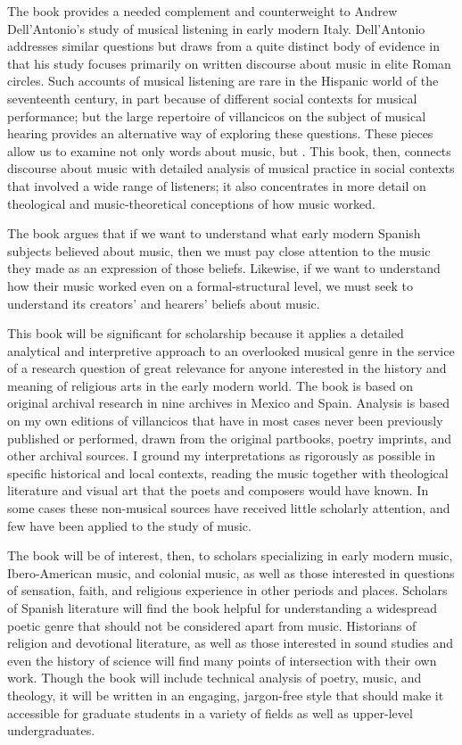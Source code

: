 \documentclass{vcbook-proposal}
\begin{document}
The book provides a needed complement and counterweight to Andrew
Dell'Antonio's study of musical listening in early modern Italy.%
    \Autocite{DellAntonio:Listening}
Dell'Antonio addresses similar questions but draws from a quite distinct body of
evidence in that his study focuses primarily on written discourse about music in
elite Roman circles.
Such accounts of musical listening are rare in the Hispanic world of the
seventeenth century, in part because of different social contexts for musical
performance; but the large repertoire of villancicos on the subject of musical
hearing provides an alternative way of exploring these questions.
These pieces allow us to examine not only words about music, but .
This book, then, connects discourse about music with detailed analysis of musical
practice in social contexts that involved a wide range of listeners; it also 
concentrates in more detail on theological and music-theoretical conceptions
of how music worked.

The book argues that if we want to understand what early modern Spanish 
subjects believed about music, then we must pay close attention to the music 
they made as an expression of those beliefs.
Likewise, if we want to understand how their music worked even on a 
formal-structural level, we must seek to understand its creators' and hearers' 
beliefs about music.

This book will be significant for scholarship because it applies a detailed
analytical and interpretive approach to an overlooked musical genre in the
service of a research question of great relevance for anyone interested in the
history and meaning of religious arts in the early modern world.
The book is based on original archival research in nine archives in Mexico and 
Spain.
Analysis is based on my own editions of villancicos that have in most cases 
never been previously published or performed, drawn from the original partbooks, 
poetry imprints, and other archival sources.
I ground my interpretations as rigorously as possible in specific historical 
and local contexts, reading the music together with theological literature and 
visual art that the poets and composers would have known.
In some cases these non-musical sources have received little scholarly 
attention, and few have been applied to the study of music.

The book will be of interest, then, to scholars specializing in early
modern music, Ibero-American music, and colonial music, as well as those
interested in questions of sensation, faith, and religious experience in other
periods and places.
Scholars of Spanish literature will find the book helpful for understanding a
widespread poetic genre that should not be considered apart from music.
Historians of religion and devotional literature, as well as those interested
in sound studies and even the history of science will find many points of
intersection with their own work.
Though the book will include technical analysis of poetry, music, and theology,
it will be written in an engaging, jargon-free style that should make it
accessible for graduate students in a variety of fields as well as upper-level
undergraduates. 
\end{document}
